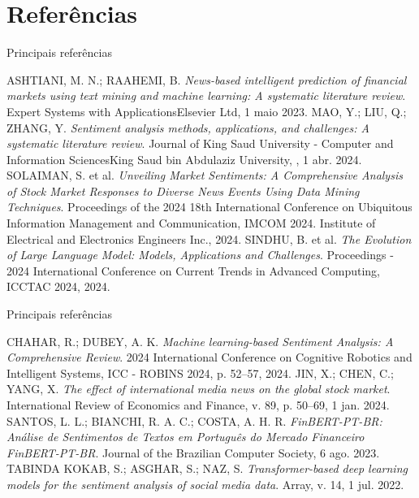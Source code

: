 \section{Referências} %

\begin{frame}{Principais referências}
    \footnotesize
    \begin{thebibliography}{99}
         ASHTIANI, M. N.; RAAHEMI, B. \textit{News-based intelligent prediction of financial markets using text mining and machine learning: A systematic literature review}. Expert Systems with ApplicationsElsevier Ltd, 1 maio 2023.
        \medskip
         MAO, Y.; LIU, Q.; ZHANG, Y. \textit{Sentiment analysis methods, applications, and challenges: A systematic literature review}. Journal of King Saud University - Computer and Information SciencesKing Saud bin Abdulaziz University, , 1 abr. 2024.
        \medskip
         SOLAIMAN, S. et al. \textit{Unveiling Market Sentiments: A Comprehensive Analysis of Stock Market Responses to Diverse News Events Using Data Mining Techniques}. Proceedings of the 2024 18th International Conference on Ubiquitous Information Management and Communication, IMCOM 2024. Institute of Electrical and Electronics Engineers Inc., 2024. 
        \medskip
         SINDHU, B. et al. \textit{The Evolution of Large Language Model: Models, Applications and Challenges}. Proceedings - 2024 International Conference on Current Trends in Advanced Computing, ICCTAC 2024, 2024. 
    \end{thebibliography}
    
\end{frame}

\begin{frame}{Principais referências}
    \footnotesize
    \begin{thebibliography}{99}
         CHAHAR, R.; DUBEY, A. K. \textit{Machine learning-based Sentiment Analysis: A Comprehensive Review}. 2024 International Conference on Cognitive Robotics and Intelligent Systems, ICC - ROBINS 2024, p. 52–57, 2024.
        \medskip
         JIN, X.; CHEN, C.; YANG, X. \textit{The effect of international media news on the global stock market}. International Review of Economics and Finance, v. 89, p. 50–69, 1 jan. 2024.
        \medskip
         SANTOS, L. L.; BIANCHI, R. A. C.; COSTA, A. H. R. \textit{FinBERT-PT-BR: Análise de Sentimentos de Textos em Português do Mercado Financeiro FinBERT-PT-BR}. Journal of the Brazilian Computer Society, 6 ago. 2023.
        \medskip
         TABINDA KOKAB, S.; ASGHAR, S.; NAZ, S. \textit{Transformer-based deep learning models for the sentiment analysis of social media data}. Array, v. 14, 1 jul. 2022. 
    \end{thebibliography}
\end{frame}

